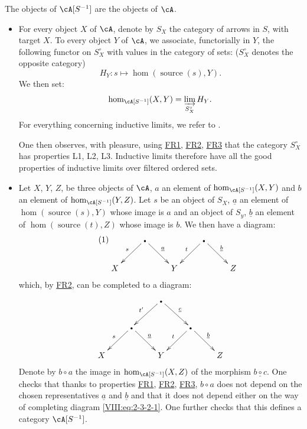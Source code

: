 \subsubsection{}\label{VIII:2-3-2}

The objects of $\cA[S^{-1}]$ are the objects of $\cA$.
\begin{itemize}
  \item For every object $X$ of $\cA$, denote by $S_X$ the category of
    arrows in $S$, with target $X$. To every object $Y$ of
    $\cA$, we associate, functorially in $Y$, the following functor on
    $S_X^\circ$ with values in the category of sets:
    ($S_X^\circ$ denotes the opposite category) 
    \[
      H_Y:s\mapsto \hom(\operatorname{source}(s),Y) \text{.}
    \]
    We then set:
    \[
      \hom_{\cA[S^{-1}]}(X,Y) = \varinjlim_{S_X^\circ} H_Y \text{.}
    \]
    For everything concerning inductive limits, we refer to
    \cite{ar62}.

    One then observes, with pleasure, using \hyperlink{VIII:FR1}{FR1},
    \hyperlink{VIII:FR2}{FR2}, \hyperlink{VIII:FR3}{FR3} that the category
    $S_X^\circ$ has properties L1, L2, L3. Inductive limits
    therefore have all the good properties of inductive limits
    over filtered ordered sets.
  \item Let $X$, $Y$, $Z$, be three objects of $\cA$, $a$ an element of
    $\hom_{\cA[S^{-1}]}(X,Y)$ and $b$ an element of
    $\hom_{\cA[S^{-1}]}(Y,Z)$. Let $s$ be an object of $S_X$, $\underline a$ an
    element of $\hom(\operatorname{source}(s),Y)$ whose image is $a$ and
    an object of $S_y$, $\underline b$ an element of
    $\hom(\operatorname{source}(t),Z)$ whose image is $b$. We then have a
    diagram: 
    \begin{equation*}\tag{1}\label{VIII:eq:2-3-2-1}
    \xymatrix{
      & \bullet \ar[dl]_-s \ar[dr]^-{\underline a} 
        & 
        & \bullet \ar[dl]_-t \ar[dr]^-{\underline b} \\
      X 
        & 
        & Y 
        & 
        & Z 
    }
    \end{equation*}
    which, by \hyperlink{VIII:FR2}{FR2}, can be completed to a
    diagram: 
    \[\xymatrix{
      & & \bullet \ar[dl]_-{t'} \ar[dr]^-{\underline c} \\
      & \bullet \ar[dl]_-s \ar[dr]^-{\underline a} 
        & & \bullet \ar[dl]_-t \ar[dr]^-{\underline b} \\
      X 
        & & Y 
        & & Z 
    }\]
    Denote by $b\circ a$ the image in $\hom_{\cA[S^{-1}]}(X,Z)$ of the morphism
    $\underline{b\circ c}$. One checks that thanks to properties
    \hyperlink{VIII:FR1}{FR1}, \hyperlink{VIII:FR2}{FR2},
    \hyperlink{VIII:FR3}{FR3}, $b\circ a$ does not depend on the chosen representatives
    $\underline a$ and $\underline b$ and that it does not depend either
    on the way of completing diagram \eqref{VIII:eq:2-3-2-1}. One
    further checks that this defines a category $\cA[S^{-1}]$.
\end{itemize}

